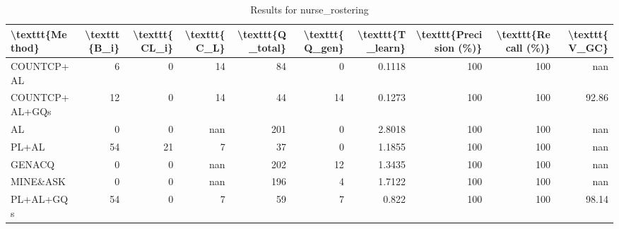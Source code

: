 \begin{table}[ht]
\caption{Results for nurse_rostering}
\begin{tabular}{lrrrrrrrrr}
\hline
 \textbackslash{}texttt\{Method\}   &   \textbackslash{}texttt\{B\_i\} &   \textbackslash{}texttt\{CL\_i\} &   \textbackslash{}texttt\{C\_L\} &   \textbackslash{}texttt\{Q\_total\} &   \textbackslash{}texttt\{Q\_gen\} &   \textbackslash{}texttt\{T\_learn\} &   \textbackslash{}texttt\{Precision (\%)\} &   \textbackslash{}texttt\{Recall (\%)\} &   \textbackslash{}texttt\{V\_GC\} \\
\hline
 COUNTCP+AL        &              6 &               0 &             14 &                 84 &                0 &             0.1118 &                      100 &                   100 &          nan    \\
 COUNTCP+AL+GQs    &             12 &               0 &             14 &                 44 &               14 &             0.1273 &                      100 &                   100 &           92.86 \\
 AL                &              0 &               0 &            nan &                201 &                0 &             2.8018 &                      100 &                   100 &          nan    \\
 PL+AL             &             54 &              21 &              7 &                 37 &                0 &             1.1855 &                      100 &                   100 &          nan    \\
 GENACQ            &              0 &               0 &            nan &                202 &               12 &             1.3435 &                      100 &                   100 &          nan    \\
 MINE\&ASK          &              0 &               0 &            nan &                196 &                4 &             1.7122 &                      100 &                   100 &          nan    \\
 PL+AL+GQs         &             54 &               0 &              7 &                 59 &                7 &             0.822  &                      100 &                   100 &           98.14 \\
\hline
\end{tabular}
\end{table}